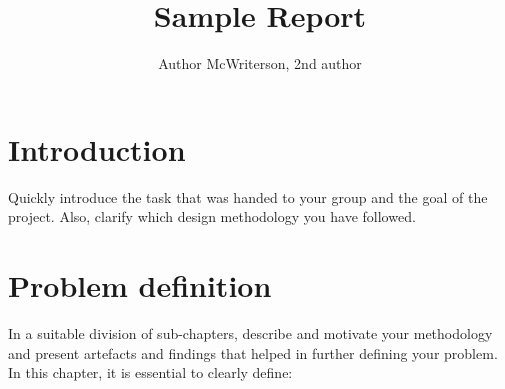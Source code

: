 \documentclass[a4paper, 11pt]{article}
\title{Sample Report}
\author{Author McWriterson, 2nd author}
\begin{document}
\maketitle



\section{Introduction}
Quickly introduce the task that was handed to your group and the goal of the project. Also, clarify which design methodology you have followed.

\section{Problem definition}
In a suitable division of sub-chapters, describe and motivate your methodology and present artefacts and findings that helped in further defining
your problem. In this chapter, it is essential to clearly define:
\end{document}
